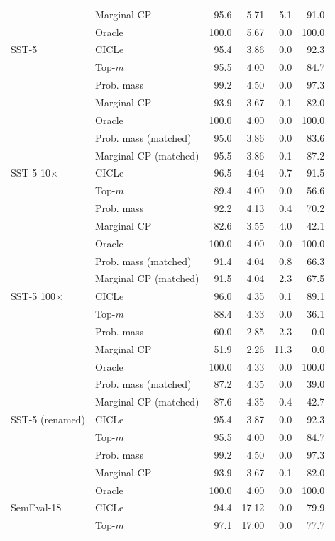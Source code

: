 \begin{tabular}{llrrrr}
 & Marginal CP & 95.6 & 5.71 & 5.1 & 91.0 \\
 & Oracle & 100.0 & 5.67 & 0.0 & 100.0 \\
\addlinespace
SST-5 & CICLe & 95.4 & 3.86 & 0.0 & 92.3 \\
 & Top-$m$ & 95.5 & 4.00 & 0.0 & 84.7 \\
 & Prob. mass & 99.2 & 4.50 & 0.0 & 97.3 \\
 & Marginal CP & 93.9 & 3.67 & 0.1 & 82.0 \\
 & Oracle & 100.0 & 4.00 & 0.0 & 100.0 \\
 & Prob. mass (matched) & 95.0 & 3.86 & 0.0 & 83.6 \\
 & Marginal CP (matched) & 95.5 & 3.86 & 0.1 & 87.2 \\
\addlinespace
SST-5 10$\times$ & CICLe & 96.5 & 4.04 & 0.7 & 91.5 \\
 & Top-$m$ & 89.4 & 4.00 & 0.0 & 56.6 \\
 & Prob. mass & 92.2 & 4.13 & 0.4 & 70.2 \\
 & Marginal CP & 82.6 & 3.55 & 4.0 & 42.1 \\
 & Oracle & 100.0 & 4.00 & 0.0 & 100.0 \\
 & Prob. mass (matched) & 91.4 & 4.04 & 0.8 & 66.3 \\
 & Marginal CP (matched) & 91.5 & 4.04 & 2.3 & 67.5 \\
\addlinespace
SST-5 100$\times$ & CICLe & 96.0 & 4.35 & 0.1 & 89.1 \\
 & Top-$m$ & 88.4 & 4.33 & 0.0 & 36.1 \\
 & Prob. mass & 60.0 & 2.85 & 2.3 & 0.0 \\
 & Marginal CP & 51.9 & 2.26 & 11.3 & 0.0 \\
 & Oracle & 100.0 & 4.33 & 0.0 & 100.0 \\
 & Prob. mass (matched) & 87.2 & 4.35 & 0.0 & 39.0 \\
 & Marginal CP (matched) & 87.6 & 4.35 & 0.4 & 42.7 \\
\addlinespace
SST-5 (renamed) & CICLe & 95.4 & 3.87 & 0.0 & 92.3 \\
 & Top-$m$ & 95.5 & 4.00 & 0.0 & 84.7 \\
 & Prob. mass & 99.2 & 4.50 & 0.0 & 97.3 \\
 & Marginal CP & 93.9 & 3.67 & 0.1 & 82.0 \\
 & Oracle & 100.0 & 4.00 & 0.0 & 100.0 \\
\addlinespace
SemEval-18 & CICLe & 94.4 & 17.12 & 0.0 & 79.9 \\
 & Top-$m$ & 97.1 & 17.00 & 0.0 & 77.7 \\

\end{tabular}
